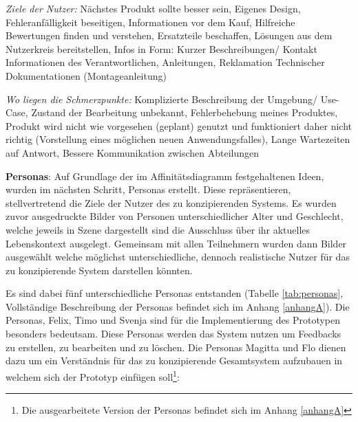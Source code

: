 \vspace{2mm}
\textit{Ziele der Nutzer: } 
Nächstes Produkt sollte besser sein, Eigenes Design, Fehleranfälligkeit beseitigen, Informationen vor dem Kauf, Hilfreiche Bewertungen finden und verstehen, Ersatzteile beschaffen, Lösungen aus dem Nutzerkreis bereitstellen, Infos in Form: Kurzer Beschreibungen/ Kontakt Informationen des Verantwortlichen, Anleitungen, Reklamation Technischer Dokumentationen (Montageanleitung)

\vspace{2mm}
\textit{Wo liegen die Schmerzpunkte: } 
Komplizierte Beschreibung der Umgebung/ Use-Case, Zustand der Bearbeitung unbekannt, Fehlerbehebung meines Produktes, Produkt wird nicht wie vorgesehen (geplant) genutzt und funktioniert daher nicht richtig (Vorstellung eines möglichen neuen Anwendungsfalles), Lange Wartezeiten auf Antwort, Bessere Kommunikation zwischen Abteilungen

\textbf{Personas}:
Auf Grundlage der im Affinitätsdiagramm festgehaltenen Ideen, wurden im nächsten Schritt, Personas erstellt. Diese repräsentieren, stellvertretend die Ziele der Nutzer des zu konzipierenden Systems. 
Es wurden zuvor ausgedruckte Bilder von Personen unterschiedlicher Alter und Geschlecht, welche jeweils in Szene dargestellt sind die Ausschluss über ihr aktuelles Lebenskontext ausgelegt. 
Gemeinsam mit allen Teilnehmern wurden dann Bilder ausgewählt welche möglichst unterschiedliche, dennoch realistische Nutzer für das zu konzipierende System darstellen könnten. 

Es sind dabei fünf unterschiedliche Personas entstanden (Tabelle \ref{tab:personas}, Vollständige Beschreibung der Personas befindet sich im Anhang \ref{anhangA}). Die Personas, Felix, Timo und Svenja sind für die Implementierung des Prototypen besonders bedeutsam. 
Diese Personas werden das System nutzen um Feedbacks zu erstellen, zu bearbeiten und zu löschen. Die Personas Magitta und Flo dienen dazu um ein Verständnis für das zu 
konzipierende Gesamtsystem aufzubauen in welchem sich der Prototyp einfügen soll\footnote{Die ausgearbeitete Version der Personas befindet sich im Anhang \ref{anhangA}}: 

